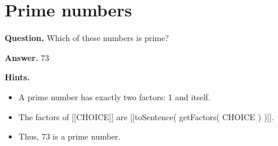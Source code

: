 \documentclass{article}
\begin{document}
\section*{Prime numbers}
\textbf{Question.} Which of these numbers is prime?

\textbf{Answer.} 73

\textbf{Hints.}
\begin{itemize}
  \item A prime number has exactly two factors: 1 and itself.
  \item The factors of [[CHOICE]] are [[toSentence( getFactors( CHOICE ) )]].
  \item Thus, 73 is a prime number.
\end{itemize}
\end{document}
